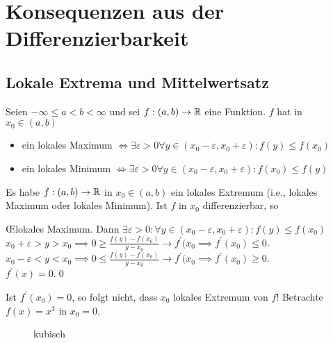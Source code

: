 \section{Konsequenzen aus der Differenzierbarkeit}
\subsection{Lokale Extrema und Mittelwertsatz}

\begin{subdefinition}
	Seien $ - \infty \leq  a < b < \infty $ und sei $ f: (a, b) \to \mathbb{R}  $ eine Funktion. $ f $ hat in $ x_0 \in (a, b) $ 
	\begin{itemize}
		\item ein lokales Maximum $ \iff \exists \varepsilon > 0 \forall y \in ( x_0 - \varepsilon , x_0 + \varepsilon ) : f(y) \leq f(x_0) $
		\item ein lokales Minimum $ \iff \exists \varepsilon > 0 \forall y \in ( x_0 - \varepsilon , x_0 + \varepsilon ) : f(x_0) \leq f(y) $
	\end{itemize}
	
\end{subdefinition}

\begin{subtheorem}
	Es habe $ f:(a,b) \to \mathbb{R}  $ in $ x_0 \in (a, b) $ ein lokales Extremum (i.e., lokales Maximum oder lokales Minimum). Ist $ f $ in $ x_0 $ differenzierbar, so 
\end{subtheorem}

\begin{subproof*}
	\OE lokales Maximum. Dann $ \exists \varepsilon > 0 : \forall y \in (x_0 - \varepsilon , x_0 + \varepsilon ) : f(y) \leq f(x_0) $\\
	$ x_0 + \varepsilon > y > x_0 \implies 0 \geq \frac{ f(y) - f(x_0) }{ y - x_0 } \to f^\prime(x_0 \implies  f^\prime(x_0) \leq 0 $.\\
	$ x_0 - \varepsilon < y < x_0 \implies 0 \leq  \frac{ f(y) - f(x_0) }{ y - x_0 } \to f^\prime(x_0 \implies  f^\prime(x_0) \geq 0 $.\\
	$ f^\prime(x) = 0 $.\qed
\end{subproof*}

\begin{subexample}
	Ist $ f^\prime(x_0) = 0 $, so folgt nicht, dass $ x_0  $ lokales Extremum von $ f $! Betrachte $ f(x) = x^3 $ in $ x_0 = 0 $.
	\begin{figure}[H]
		\centering
		\caption{kubisch}
		\label{plot:12.1.3.1}
	\end{figure}
\end{subexample}

